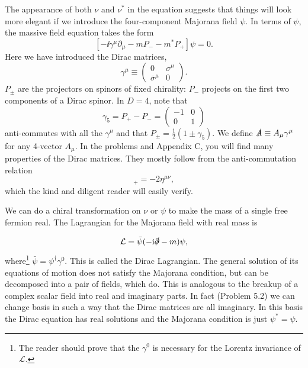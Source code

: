 The appearance of both $\nu$ and $\nu^*$ in the equation suggests that things will look
more elegant if we introduce the four-component Majorana field $\psi$. In terms of $\psi$, the
massive field equation takes the form
\begin{equation*}
  \left[-\ii\gamma^\mu\partial_\mu-mP_- -m^*P_+\right]\psi=0.
\end{equation*}
Here we have introduced the Dirac matrices,
\begin{equation*}
  \gamma^\mu\equiv\begin{pmatrix}0&\sigma^\mu\\ \bar\sigma^\mu&0\end{pmatrix}.
\end{equation*}
$P_\pm$ are the projectors on spinors of fixed chirality: $P_-$ projects on the first two
components of a Dirac spinor. In $D=4$, note that
\begin{equation*}
  \gamma_5=P_+-P_-=\begin{pmatrix}-1&0\\0&1\end{pmatrix}
\end{equation*}
anti-commutes with all the $\gamma^\mu$ and that $P_\pm=\frac12(1\pm\gamma_5)$. We define $\slashed A\equiv A_\mu\gamma^\mu$ for any
4-vector $A_\mu$. In the problems and Appendix C, you will find many properties of the
Dirac matrices. They mostly follow from the anti-commutation relation
\begin{equation*}
  [\gamma^\mu,\gamma^\nu]_+=-2\eta^{\mu\nu},
\end{equation*}
which the kind and diligent reader will easily verify.

We can do a chiral transformation on $\nu$ or $\psi$ to make the mass of a single free fermion
real. The Lagrangian for the Majorana field with real mass is

\begin{equation}
  \mathcal{L}=\bar\psi(-\mathrm{i}\slashed\partial-m)\psi,
  \label{eq:5.2}
\end{equation}
where\footnote[7]{The reader should prove that the $\gamma^0$ is necessary for the Lorentz invariance of $\mathcal{L}$.} $\bar\psi=\psi^\dagger\gamma^0$. This is called the Dirac Lagrangian. The general solution of its
equations of motion does not satisfy the Majorana condition, but can be decomposed
into a pair of fields, which do. This is analogous to the breakup of a complex scalar
field into real and imaginary parts. In fact (Problem 5.2) we can change basis in such a
way that the Dirac matrices are all imaginary. In this basis the Dirac equation has real
solutions and the Majorana condition is just $\psi^*=\psi$.

